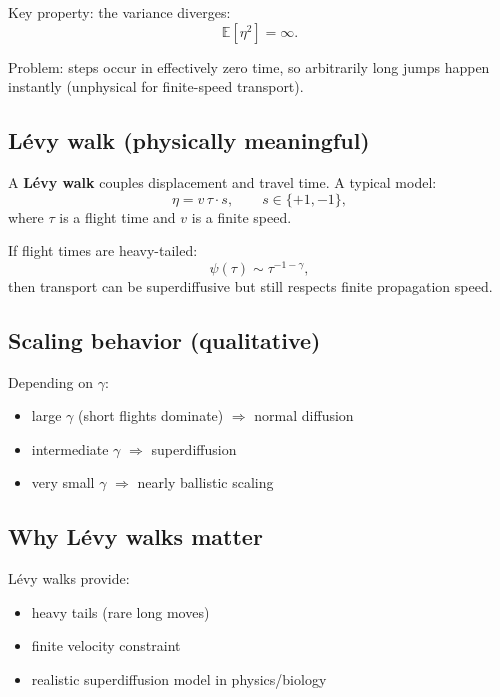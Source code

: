 Key property: the variance diverges:
\begin{equation}
\mathbb{E}[\eta^2]=\infty.
\end{equation}

Problem: steps occur in effectively zero time, so arbitrarily long jumps happen instantly
(unphysical for finite-speed transport).

\subsection{Lévy walk (physically meaningful)}
A \textbf{Lévy walk} couples displacement and travel time.
A typical model:
\begin{equation}
\eta = v\,\tau \cdot s,
\qquad s\in\{+1,-1\},
\end{equation}
where $\tau$ is a flight time and $v$ is a finite speed.

If flight times are heavy-tailed:
\begin{equation}
\psi(\tau)\sim \tau^{-1-\gamma},
\end{equation}
then transport can be superdiffusive but still respects finite propagation speed.

\subsection{Scaling behavior (qualitative)}
Depending on $\gamma$:
\begin{itemize}
\item large $\gamma$ (short flights dominate) $\Rightarrow$ normal diffusion
\item intermediate $\gamma$ $\Rightarrow$ superdiffusion
\item very small $\gamma$ $\Rightarrow$ nearly ballistic scaling
\end{itemize}

\subsection{Why Lévy walks matter}
Lévy walks provide:
\begin{itemize}
\item heavy tails (rare long moves)
\item finite velocity constraint
\item realistic superdiffusion model in physics/biology
\end{itemize}


